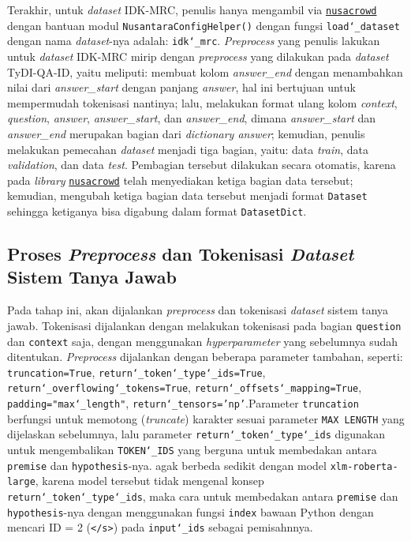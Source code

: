 Terakhir, untuk \emph{dataset} IDK-MRC, penulis hanya mengambil via \href{https://github.com/IndoNLP/nusa-crowd/tree/master/nusacrowd/nusa_datasets/}{\texttt{nusacrowd}} dengan bantuan modul \texttt{NusantaraConfigHelper()} dengan fungsi \texttt{load\char`_dataset} dengan nama \emph{dataset}-nya adalah: \texttt{idk\char`_mrc}. \emph{Preprocess} yang penulis lakukan untuk \emph{dataset} IDK-MRC mirip dengan \emph{preprocess} yang dilakukan pada \emph{dataset} TyDI-QA-ID, yaitu meliputi: membuat kolom \emph{answer\_end} dengan menambahkan nilai dari \emph{answer\_start} dengan panjang \emph{answer}, hal ini bertujuan untuk mempermudah tokenisasi nantinya; lalu, melakukan format ulang kolom \emph{context}, \emph{question}, \emph{answer}, \emph{answer\_start}, dan \emph{answer\_end}, dimana  \emph{answer\_start} dan \emph{answer\_end} merupakan bagian dari \emph{dictionary answer}; kemudian, penulis melakukan pemecahan \emph{dataset} menjadi tiga bagian, yaitu: data \emph{train}, data \emph{validation}, dan data \emph{test}. Pembagian tersebut dilakukan secara otomatis, karena pada \emph{library} \href{https://github.com/IndoNLP/nusa-crowd/tree/master/nusacrowd/nusa_datasets/}{\texttt{nusacrowd}} telah menyediakan ketiga bagian data tersebut; kemudian, mengubah ketiga bagian data tersebut menjadi format \texttt{Dataset} sehingga ketiganya bisa digabung dalam format \texttt{DatasetDict}.

\subsection{Proses \emph{Preprocess} dan Tokenisasi \emph{Dataset} Sistem Tanya Jawab}
\label{4.2.4}
Pada tahap ini, akan dijalankan  \emph{preprocess} dan tokenisasi \emph{dataset} sistem tanya jawab. Tokenisasi dijalankan dengan melakukan tokenisasi pada bagian \texttt{question} dan \texttt{context} saja, dengan menggunakan \emph{hyperparameter} yang sebelumnya sudah ditentukan. \emph{Preprocess} dijalankan dengan beberapa parameter tambahan, seperti: \texttt{truncation=True}, \texttt{return\char`_token\char`_type\char`_ids=True}, \texttt{return\char`_overflowing\char`_tokens=True}, \texttt{return\char`_offsets\char`_mapping=True}, \texttt{padding="max\char`_length"}, \texttt{return\char`_tensors='np'}.Parameter \texttt{truncation} berfungsi untuk memotong (\emph{truncate}) karakter sesuai parameter \texttt{MAX LENGTH} yang dijelaskan sebelumnya, lalu parameter \texttt{return\char`_token\char`_type\char`_ids} digunakan untuk mengembalikan \texttt{TOKEN\char`_IDS} yang berguna untuk membedakan antara \texttt{premise} dan \texttt{hypothesis}-nya. agak berbeda sedikit dengan model \texttt{xlm-roberta-large}, karena model tersebut tidak mengenal konsep \texttt{return\char`_token\char`_type\char`_ids}, maka cara untuk membedakan antara \texttt{premise} dan \texttt{hypothesis}-nya dengan menggunakan fungsi \texttt{index} bawaan Python dengan mencari ID = 2 (\texttt{</s>}) pada \texttt{input\char`_ids} sebagai pemisahnnya. 

